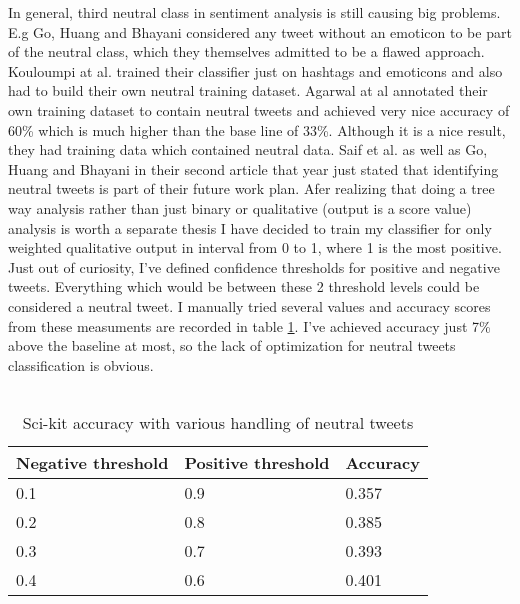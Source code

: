 In general, third neutral class in sentiment analysis is still causing big problems. E.g Go, Huang and Bhayani \cite{go2009twitter2} considered any tweet without an emoticon to be part of the neutral class, which they themselves admitted to be a flawed approach. Kouloumpi at al. \cite{kouloumpis2011twitter} trained their classifier just on hashtags and emoticons and also had to build their own neutral training dataset.  Agarwal at al \cite{agarwal2011sentiment} annotated their own training dataset to contain neutral tweets and achieved very nice accuracy of 60\% which is much higher than the base line of 33\%. Although it is a nice result, they had training data which contained neutral data. Saif et al. \cite{saif2012semantic} as well as Go, Huang and Bhayani \cite{go2009twitter} in their second article that year just stated that identifying neutral tweets is part of their future work plan.  Afer realizing that doing a tree way analysis rather than just binary or qualitative (output is a score value) analysis is worth a separate thesis I have decided to train my classifier for only weighted qualitative output in interval from 0 to 1, where 1 is the most positive. Just out of curiosity, I've     defined confidence thresholds for positive and negative tweets. Everything which would be between these 2 threshold levels could be considered a neutral tweet. I manually tried several values and accuracy scores from these measuments are recorded in table \ref{table:negativeAccuracy}. I've achieved accuracy just 7\% above the baseline at most, so the lack of optimization for neutral tweets classification is obvious.\\
\\
\begin{table}
\centering
\begin{tabular}{|p{4cm}|p{4cm}|p{3cm}|}
 \hline
\textbf{ Negative threshold }& \textbf{Positive threshold} & \textbf{Accuracy}\\
 \hline
 0.1 & 0.9 & 0.357\\ \hline
 0.2 & 0.8 & 0.385\\ \hline
 0.3 & 0.7 & 0.393\\ \hline 
 0.4 & 0.6 & 0.401\\ \hline 
\end{tabular}
\caption{Sci-kit accuracy with various handling of neutral tweets}
\label{table:negativeAccuracy}
\end{table}

